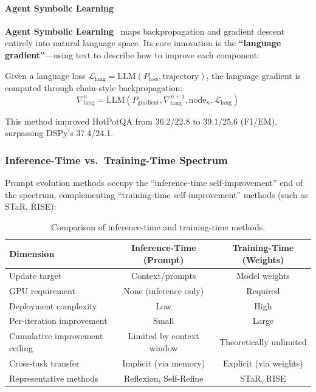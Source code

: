 \paragraph{Agent Symbolic Learning}

\textbf{Agent Symbolic Learning}~\citep{agentsymboliclearning2024} maps backpropagation and gradient descent entirely into natural language space. Its core innovation is the \textbf{``language gradient''}---using text to describe how to improve each component:

\begin{definition}
Given a language loss $\mathcal{L}_{\mathrm{lang}} = \mathrm{LLM}(P_{\mathrm{loss}}, \text{trajectory})$, the language gradient is computed through chain-style backpropagation:
\begin{equation}
\nabla_{\mathrm{lang}}^n = \mathrm{LLM}(P_{\mathrm{gradient}}, \nabla_{\mathrm{lang}}^{n+1}, \text{node}_n, \mathcal{L}_{\mathrm{lang}})
\label{eq:lang-gradient}
\end{equation}
\end{definition}

This method improved HotPotQA from 36.2/22.8 to 39.1/25.6 (F1/EM), surpassing DSPy's 37.4/24.1.

\subsubsection{Inference-Time vs.\ Training-Time Spectrum}

Prompt evolution methods occupy the ``inference-time self-improvement'' end of the spectrum, complementing ``training-time self-improvement'' methods (such as STaR, RISE):

\begin{table}[htbp]
\centering
\caption{Comparison of inference-time and training-time methods.}
\label{tab:inference-vs-training}
\begin{tabular}{lcc}
\toprule
\textbf{Dimension} & \textbf{Inference-Time (Prompt)} & \textbf{Training-Time (Weights)} \\
\midrule
Update target & Context/prompts & Model weights \\
GPU requirement & None (inference only) & Required \\
Deployment complexity & Low & High \\
Per-iteration improvement & Small & Large \\
Cumulative improvement ceiling & Limited by context window & Theoretically unlimited \\
Cross-task transfer & Implicit (via memory) & Explicit (via weights) \\
Representative methods & Reflexion, Self-Refine & STaR, RISE \\
\bottomrule
\end{tabular}
\end{table}

